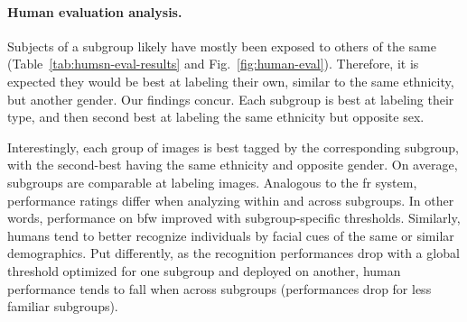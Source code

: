 \vspace{-5mm}
\noindent\paragraph{Human evaluation analysis.}
Subjects of a subgroup likely have mostly been exposed to others of the same (Table~\ref{tab:humsn-eval-results} and Fig.~\ref{fig:human-eval}). Therefore, it is expected they would be best at labeling their own, similar to the same ethnicity, but another gender. Our findings concur. Each subgroup is best at labeling their type, and then second best at labeling the same ethnicity but opposite sex. 

Interestingly, each group of images is best tagged by the corresponding subgroup, with the second-best having the same ethnicity and opposite gender. On average, subgroups are comparable at labeling images. Analogous to the \gls{fr} system, performance ratings differ when analyzing within and across subgroups. In other words, performance on \gls{bfw} improved with subgroup-specific thresholds. Similarly, humans tend to better recognize individuals by facial cues of the same or similar demographics. Put differently, as the recognition performances drop with a global threshold optimized for one subgroup and deployed on another, human performance tends to fall when across subgroups (\ie performances drop for less familiar subgroups).
 